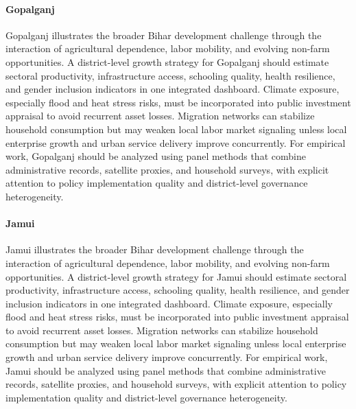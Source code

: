 \documentclass[preprint,12pt]{elsarticle}
\begin{document}
\paragraph{Gopalganj} Gopalganj illustrates the broader Bihar development challenge through the interaction of agricultural dependence, labor mobility, and evolving non-farm opportunities. A district-level growth strategy for Gopalganj should estimate sectoral productivity, infrastructure access, schooling quality, health resilience, and gender inclusion indicators in one integrated dashboard. Climate exposure, especially flood and heat stress risks, must be incorporated into public investment appraisal to avoid recurrent asset losses. Migration networks can stabilize household consumption but may weaken local labor market signaling unless local enterprise growth and urban service delivery improve concurrently. For empirical work, Gopalganj should be analyzed using panel methods that combine administrative records, satellite proxies, and household surveys, with explicit attention to policy implementation quality and district-level governance heterogeneity.

\paragraph{Jamui} Jamui illustrates the broader Bihar development challenge through the interaction of agricultural dependence, labor mobility, and evolving non-farm opportunities. A district-level growth strategy for Jamui should estimate sectoral productivity, infrastructure access, schooling quality, health resilience, and gender inclusion indicators in one integrated dashboard. Climate exposure, especially flood and heat stress risks, must be incorporated into public investment appraisal to avoid recurrent asset losses. Migration networks can stabilize household consumption but may weaken local labor market signaling unless local enterprise growth and urban service delivery improve concurrently. For empirical work, Jamui should be analyzed using panel methods that combine administrative records, satellite proxies, and household surveys, with explicit attention to policy implementation quality and district-level governance heterogeneity.
\end{document}
